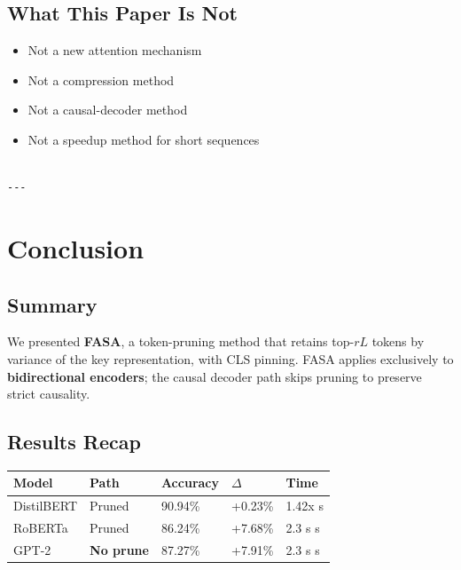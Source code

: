 \subsection{What This Paper Is Not}

\begin{itemize}
\item Not a new attention mechanism
\item Not a compression method
\item Not a causal-decoder method
\item Not a speedup method for short sequences
\end{itemize}
\begin{lstlisting}

---
\end{lstlisting}


\section{Conclusion}

\subsection{Summary}

We presented \textbf{FASA}, a token-pruning method that retains top-$rL$ tokens 
by variance of the key representation, with CLS pinning. FASA applies 
exclusively to \textbf{bidirectional encoders}; the causal decoder path skips 
pruning to preserve strict causality.

\subsection{Results Recap}

\begin{table}[H]
\centering
\small
\begin{tabular}{lllll}
\toprule
\textbf{Model} & \textbf{Path} & \textbf{Accuracy} & \textbf{$\Delta$} & \textbf{Time} \\
\midrule
DistilBERT & Pruned & 90.94\% & +0.23\% & 1.42x s \\
RoBERTa & Pruned & 86.24\% & +7.68\% & 2.3 s s \\
GPT-2 & \textbf{No prune} & 87.27\% & +7.91\% & 2.3 s s \\
\bottomrule
\end{tabular}
\end{table}

